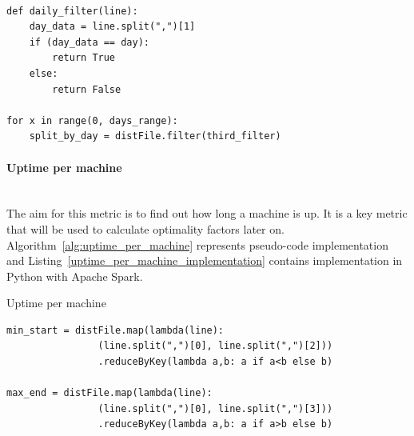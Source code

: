\documentclass[]{final_report}
\newcommand{\myparagraph}[1]{\paragraph{#1}\mbox{}\\}
\begin{document}
\begin{lstlisting}[label={daily_usage},caption={Daily usage filter},frame=single]

def daily_filter(line):
    day_data = line.split(",")[1]
    if (day_data == day):
        return True
    else:
        return False

for x in range(0, days_range):
    split_by_day = distFile.filter(third_filter)

\end{lstlisting} 


\myparagraph{Uptime per machine}

The aim for this metric is to find out how long a machine is up. It is a key metric that will be used to calculate optimality factors later on. Algorithm~\ref{alg:uptime_per_machine} represents pseudo-code implementation and Listing~\ref{uptime_per_machine_implementation} contains implementation in Python with Apache Spark. 

\begin{algorithm}[h]
\caption{Uptime per machine}
\label{alg:uptime_per_machine}
 \algrenewcommand{}
 \algrenewcommand{}
\end{algorithm}

\begin{minipage}{\linewidth}
\begin{lstlisting}[label={uptime_per_machine_implementation},caption={Uptime per machine implementation in Apache Spark},frame=single] 
min_start = distFile.map(lambda(line): 
                (line.split(",")[0], line.split(",")[2]))
                .reduceByKey(lambda a,b: a if a<b else b)

max_end = distFile.map(lambda(line): 
                (line.split(",")[0], line.split(",")[3]))
                .reduceByKey(lambda a,b: a if a>b else b)
\end{lstlisting}
\end{minipage}
\end{document}
